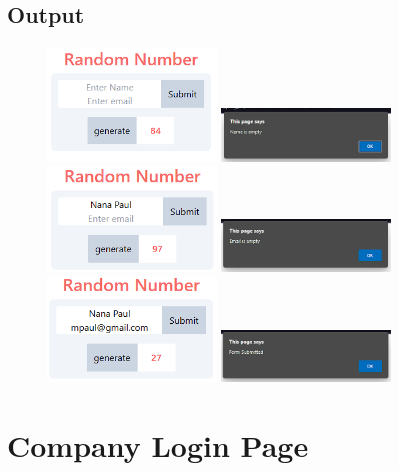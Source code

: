 \documentclass{article}
\begin{document}
\subsection{Output}
\begin{figure}[h!]
	\centering
	\includegraphics[width=0.4\textwidth]{./Assets/p1501.png}
	\includegraphics[width=0.4\textwidth]{./Assets/p1502.png}
	\includegraphics[width=0.4\textwidth]{./Assets/p1503.png}
	\includegraphics[width=0.4\textwidth]{./Assets/p1504.png}
	\includegraphics[width=0.4\textwidth]{./Assets/p1505.png}
	\includegraphics[width=0.4\textwidth]{./Assets/p1506.png}
\end{figure}
\newpage

\section{Company Login Page}
\end{document}
